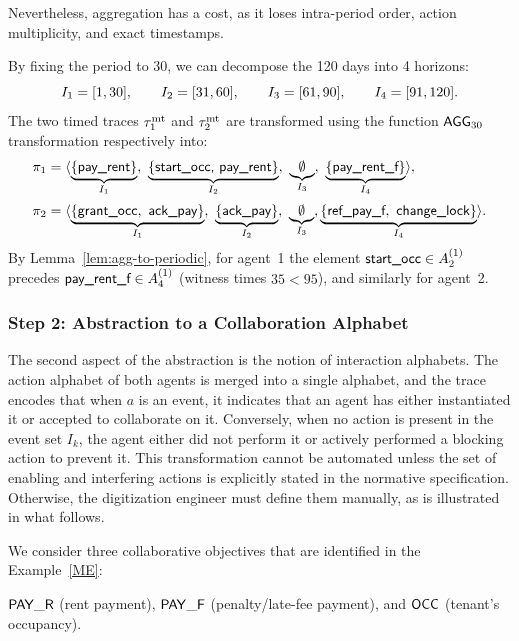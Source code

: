 Nevertheless, aggregation has a cost, as it loses intra-period order, action multiplicity, and exact timestamps.
\begin{example}
\label{ex:agg-30-locked}
By fixing the period to 30, we can decompose the 120 days into 4 horizons:
\[
I_{1}=[1,30],\qquad I_{2}=[31,60],\qquad I_{3}=[61,90],\qquad I_{4}=[91,120].
\]
The two timed traces $\tau^{\mathrm{mt}}_1$ and $\tau^{\mathrm{mt}}_2$ are transformed using the function $\mathsf{AGG}_{30}$ transformation respectively into:
\[
\begin{aligned}
\pi_1&=\trace{%
\underbrace{\{\textsf{pay\_rent}\}}_{\Ik{1}},\
\underbrace{\{\textsf{start\_occ, \textsf{pay\_rent}}\}}_{\Ik{2}},\
\underbrace{\emptyset}_{\Ik{3}},\
\underbrace{\{\textsf{pay\_rent\_f}\}}_{\Ik{4}}},\\[2pt]
\pi_2&=\trace{%
\underbrace{\{\textsf{grant\_occ},\ \textsf{ack\_pay}\}}_{\Ik{1}},\
\underbrace{\{\textsf{ack\_pay}\}}_{\Ik{2}},\
\underbrace{\emptyset}_{\Ik{3}},
\underbrace{\{\textsf{ref\_pay\_f},\ \textsf{change\_lock}\}}_{\Ik{4}}}.
\end{aligned}
\]
By Lemma~\ref{lem:agg-to-periodic}, for agent~1 the element $\textsf{start\_occ}\in A^{(1)}_{2}$ precedes
$\textsf{pay\_rent\_f}\in A^{(1)}_{4}$ (witness times $35<95$), and similarly for agent~2.
\end{example}

\subsubsection{Step 2: Abstraction to a Collaboration Alphabet}
The second aspect of the abstraction is the notion of interaction alphabets. The action alphabet of both agents is merged into a single alphabet, and the trace encodes that when $a$ is an event, it indicates that an agent has either instantiated it or accepted to collaborate on it. Conversely, when no action is present in the event set $I_k$, the agent either did not perform it or actively performed a blocking action to prevent it. This transformation cannot be automated unless the set of enabling and interfering actions is explicitly stated in the normative specification. Otherwise, the digitization engineer must define them manually, as is illustrated in what follows.

We consider three collaborative objectives that are identified in the Example~\ref{ME}:

\(\mathsf{PAY\_R}\) (rent payment), \(\mathsf{PAY\_F}\) (penalty/late-fee payment), and \(\mathsf{OCC}\) (tenant's occupancy).

